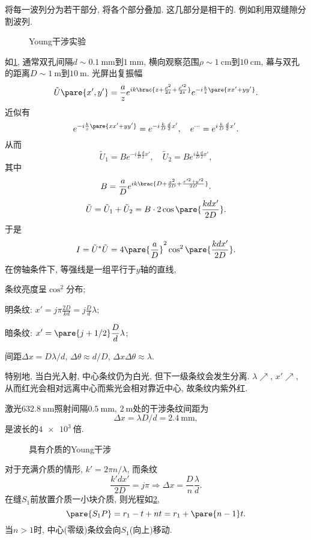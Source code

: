 \documentclass{ctexart}
\begin{document}
将每一波列分为若干部分, 将各个部分叠加. 这几部分是相干的. 例如利用双缝隙分割波列.
\par
\begin{figure}
    \centering
    \caption{Young干涉实验}
    \label{fig:Young干涉实验}
\end{figure}
如\cref{fig:Young干涉实验}, 通常双孔间隔$d\sim\SI{0.1}{\milli\meter}$到$\SI{1}{\milli\meter}$, 横向观察范围$\rho\sim\SI{1}{\centi\meter}$到$\SI{10}{\centi\meter}$, 幕与双孔的距离$D\sim\SI{1}{\meter}$到$\SI{10}{\meter}$. 光屏出复振幅
\[ \tilde{U}\pare{x',y'} = \frac{a}{z} e^{ik\brac{z + \frac{\rho^2}{2z} + \frac{\rho'^2}{2z}}} e^{-i\frac{k}{z}\pare{xx'+yy'}}. \]
近似有
\[ e^{-i\frac{k}{z}\pare{xx'+yy'}} = e^{-i\frac{k}{D} \frac{d}{2}x'},\quad e^{\cdots} = e^{i \frac{k}{D}\frac{d}{2}x'}. \]
从而
\[ \tilde{U}_1 = B e^{-i\frac{k}{D} \frac{d}{2}x'}, \quad \tilde{U}_2 = Be^{i \frac{k}{D}\frac{d}{2}x'}, \]
其中
\[ B = \frac{a}{D} e^{ik\brac{D + \frac{x^2}{2D} + \frac{x'^2 + y'^2}{2D}}}. \]
\[ \tilde{U} = \tilde{U}_1 + \tilde{U}_2 = B\cdot 2\cos\pare{\frac{kdx'}{2D}}. \]
于是
\[ I = \tilde{U}^* \tilde{U} = 4\pare{\frac{a}{D}}^2 \cos^2 \pare{\frac{kdx'}{2D}}. \]
在傍轴条件下, 等强线是一组平行于$y$轴的直线,
\begin{cenum}
    \item 条纹亮度呈$\cos^2$分布;
    \item 明条纹: $\displaystyle x' = j\pi \frac{2D}{kd} = j\frac{D}{d}\lambda$;
    \item 暗条纹: $\displaystyle x' = \pare{j+1/2}\frac{D}{d}\lambda$;
    \item 间距$\Delta x = D\lambda/d$, $\Delta\theta \approx d/D$, $\Delta x\Delta \theta \approx \lambda$.
\end{cenum}
特别地, 当白光入射, 中心条纹仍为白光, 但下一级条纹会发生分离. $\lambda \nearrow$, $x'\nearrow$, 从而红光会相对远离中心而紫光会相对靠近中心, 故条纹内紫外红.
\begin{sample}
    \begin{ex}
        激光$\SI{632.8}{\nano\meter}$照射间隔$\SI{0.5}{\milli\meter}$, $\SI{2}{\meter}$处的干涉条纹间距为
        \[ \Delta x = \lambda D/d = \SI{2.4}{\milli\meter}, \]
        是波长的$\SI{4e3}{}$倍.
    \end{ex}
\end{sample}
\begin{figure}[ht]
    \centering
    \caption{具有介质的Young干涉}
    \label{fig:具有介质的Young干涉}
\end{figure}
对于充满介质的情形, $k' = 2\pi n /\lambda$, 而条纹
\[ \frac{k' dx'}{2D} = j\pi \Rightarrow \Delta x = \frac{D}{n}\frac{\lambda}{d}. \]
在缝$S_1$前放置介质一小块介质, 则光程如\cref{fig:具有介质的Young干涉},
\[ \pare{S_1P} = r_1 - t + nt = r_1 + \pare{n-1}t. \]
当$n>1$时, 中心(零级)条纹会向$S_1$(向上)移动.
\end{document}
